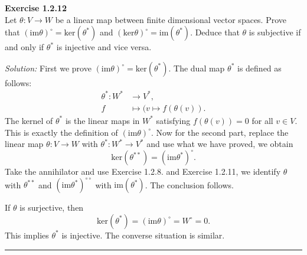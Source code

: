 \documentclass[a4paper, 11pt]{article}
\newenvironment{problem}[2][Exercise]
    { \begin{mdframed}[backgroundcolor=gray!20] \textbf{#1 #2} \\}
    {  \end{mdframed}}
\newenvironment{solution}
    {\textit{Solution:}}
    {}
\begin{document}
\begin{problem}{1.2.12}
Let \(\theta:V\rightarrow W\) be a linear map between finite dimensional vector spaces. Prove that \((\text{im}\theta)^\circ=\text{ker}(\theta^*)\) and \((\text{ker}\theta)^\circ=\text{im}(\theta^*)\). Deduce that \(\theta\) is subjective if and only if \(\theta^*\) is injective and vice versa.
\end{problem}
\begin{solution}
First we prove \((\text{im}\theta)^\circ=\text{ker}(\theta^*)\). The dual map \(\theta^*\) is defined as follows:
$$\begin{align*}
    \theta^* : W^* & \rightarrow V^*,\\ 
               f & \mapsto (v\mapsto f(\theta(v)).
\end{align*}$$
The kernel of \(\theta^*\) is the linear maps in \(W^*\) satisfying \(f(\theta(v))=0\) for all \(v\in V\). This is exactly the definition of \((\text{im}\theta)^\circ\). Now for the second part, replace the linear map \(\theta:V\rightarrow W\) with \(\theta^*:W^*\rightarrow V^*\) and use what we have proved, we obtain 
$$\text{ker}(\theta^{**})=(\text{im}\theta^*)^\circ.$$
Take the annihilator and use Exercise 1.2.8. and Exercise 1.2.11, we identify \(\theta\) with \(\theta^{**}\) and \((\text{im}\theta^*)^{\circ \circ}\) with \(\text{im}(\theta^*)\). The conclusion follows.
\par 
If \(\theta\) is surjective, then 
$$\text{ker}(\theta^*)=(\text{im}\theta)^\circ=W^\circ=0.$$
This implies \(\theta^*\) is injective. The converse situation is similar.
\\
\end{solution}
\noindent\rule{7in}{2.8pt}

\end{document}
